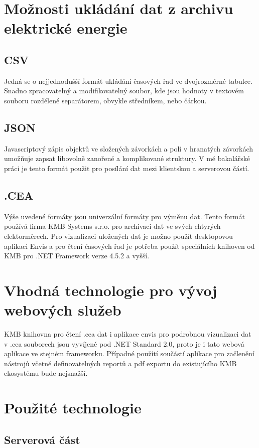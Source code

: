 \documentclass[FM,BP]{tulthesis}
\begin{document}
    \section{Možnosti ukládání dat z archivu elektrické energie}
        \subsection*{CSV}
            Jedná se o nejjednodušší formát ukládání časových řad ve dvojrozměrné tabulce. 
            Snadno zpracovatelný a modifikovatelný soubor, kde jsou hodnoty v textovém souboru rozdělené separátorem, obvykle středníkem, nebo čárkou. 
        \subsection*{JSON}
            Javascriptový zápis objektů ve složených závorkách a polí v hranatých závorkách umožňuje zapsat libovolně zanořené a komplikované struktury. 
            V mé bakalářské práci je tento formát použit pro posílání dat mezi klientskou a serverovou částí.
        \subsection*{.CEA}
            Výše uvedené formáty jsou univerzální formáty pro výměnu dat. 
            Tento formát používá firma KMB Systems s.r.o. pro archivaci dat ve svých chtyrých elektorměrech. 
            Pro vizualizaci uložených dat je možno použít desktopovou aplikaci Envis a pro čtení časových řad je 
            potřeba použít speciálních knihoven od KMB pro .NET Framework verze 4.5.2 a vyšší.

    \section{Vhodná technologie pro vývoj webových služeb}
        KMB knihovna pro čtení .cea dat i aplikace envis pro podrobnou vizualizaci dat v .cea souborech jsou vyvíjené pod .NET Standard 2.0, proto je 
        i tato webová aplikace ve stejném frameworku. 
        Případné použítí součástí aplikace pro začlenění nástrojů včetně definovatelných reportů a pdf exportu do existujícího KMB ekosystému bude nejsnažší. 

    \section{Použité technologie}
        \subsection{Serverová část}
\end{document}
